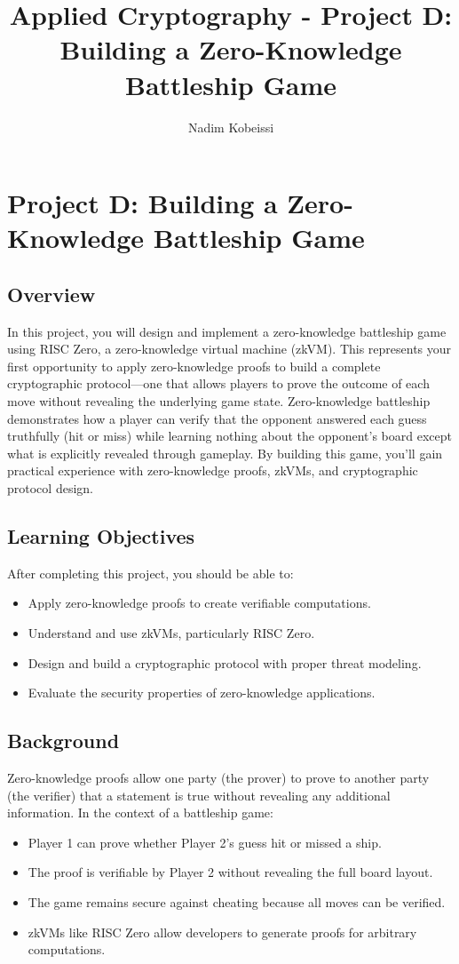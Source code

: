 \documentclass[10pt,a4paper,american]{exam}
\title{Applied Cryptography - Project D: Building a Zero-Knowledge Battleship Game}
\author{Nadim Kobeissi}
\begin{document}
\classhandoutheader
\section*{Project D: Building a Zero-Knowledge Battleship Game}

\subsection*{Overview}
In this project, you will design and implement a zero-knowledge battleship game using RISC Zero, a zero-knowledge virtual machine (zkVM). This represents your first opportunity to apply zero-knowledge proofs to build a complete cryptographic protocol—one that allows players to prove the outcome of each move without revealing the underlying game state. Zero-knowledge battleship demonstrates how a player can verify that the opponent answered each guess truthfully (hit or miss) while learning nothing about the opponent's board except what is explicitly revealed through gameplay. By building this game, you'll gain practical experience with zero-knowledge proofs, zkVMs, and cryptographic protocol design.

\subsection*{Learning Objectives}
After completing this project, you should be able to:
\begin{itemize}
	\item Apply zero-knowledge proofs to create verifiable computations.
	\item Understand and use zkVMs, particularly RISC Zero.
	\item Design and build a cryptographic protocol with proper threat modeling.
	\item Evaluate the security properties of zero-knowledge applications.
\end{itemize}

\subsection*{Background}
Zero-knowledge proofs allow one party (the prover) to prove to another party (the verifier) that a statement is true without revealing any additional information. In the context of a battleship game:
\begin{itemize}
	\item Player 1 can prove whether Player 2's guess hit or missed a ship.
	\item The proof is verifiable by Player 2 without revealing the full board layout.
	\item The game remains secure against cheating because all moves can be verified.
	\item zkVMs like RISC Zero allow developers to generate proofs for arbitrary computations.
\end{itemize}
\end{document}

